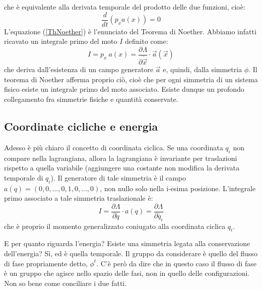 \documentclass[a4paper,openany]{article}
\begin{document}
	che è equivalente alla derivata temporale del prodotto delle due funzioni, cioè:
	\begin{equation}\label{ThNoether}
		\dfrac{d}{dt}(p_x a(x)) = 0
	\end{equation}
	L'equazione (\ref{ThNoether}) è l'enunciato del Teorema di Noether. Abbiamo infatti ricavato un integrale primo del moto $I$ definito come:
	$$
	I = p_x \> a(x) = \dfrac{\partial \Lambda}{\partial \dot{\vec{x}}}\cdot\vec{a}(\vec{x})$$
	che deriva dall'esistenza di un campo generatore $\vec{a}$ e, quindi, dalla simmetria $\phi$. Il teorema di Noether afferma proprio ciò, cioè che per ogni simmetria di un sistema fisico esiste un integrale primo del moto associato. Esiste dunque un profondo collegamento fra simmetrie fisiche e quantità conservate.
	\subsection{Coordinate cicliche e energia}
	Adesso è più chiaro il concetto di coordinata ciclica. Se una coordinata $q_i$ non compare nella lagrangiana, allora la lagrangiana è invariante per traslazioni rispetto a quella variabile (aggiungere una costante non modifica la derivata temporale di $q_i$). Il generatore di tale simmetria è il campo $a(q) = (0,0, ..., 0, 1, 0, ..., 0)$, non nullo solo nella i-esima posizione. L'integrale primo associato a tale simmetria traslazionale è:
	$$
	I = \dfrac{\partial \Lambda}{\partial \dot{q}}\cdot a(q) = \dfrac{\partial \Lambda}{\partial \dot{q_i}}
	$$
	che è proprio il momento generalizzato coniugato alla coordinata ciclica $q_i$.
	
	E per quanto riguarda l'energia? Esiste una simmetria legata alla conservazione dell'energia? Sì, ed è quella temporale. Il gruppo da considerare è quello del flusso di fase propriamente detto, $\phi^{t}$.  C'è però da dire che in questo caso il flusso di fase è un gruppo che agisce nello spazio delle fasi, non in quello delle configurazioni. Non so bene come conciliare i due fatti.
\end{document}
